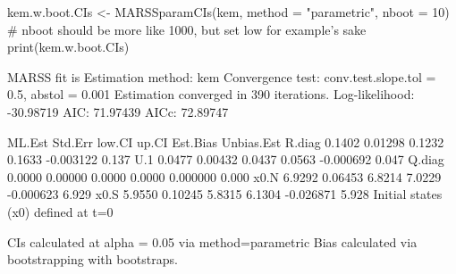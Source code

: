 \begin{Schunk}
\begin{Sinput}
 kem.w.boot.CIs <- MARSSparamCIs(kem, method = "parametric", nboot = 10)
 # nboot should be more like 1000, but set low for example's sake
 print(kem.w.boot.CIs)
\end{Sinput}
\begin{Soutput}
MARSS fit is
Estimation method: kem 
Convergence test: conv.test.slope.tol = 0.5, abstol = 0.001
Estimation converged in 390 iterations. 
Log-likelihood: -30.98719 
AIC: 71.97439   AICc: 72.89747   
 
       ML.Est Std.Err low.CI  up.CI  Est.Bias Unbias.Est
R.diag 0.1402 0.01298 0.1232 0.1633 -0.003122      0.137
U.1    0.0477 0.00432 0.0437 0.0563 -0.000692      0.047
Q.diag 0.0000 0.00000 0.0000 0.0000  0.000000      0.000
x0.N   6.9292 0.06453 6.8214 7.0229 -0.000623      6.929
x0.S   5.9550 0.10245 5.8315 6.1304 -0.026871      5.928
Initial states (x0) defined at t=0

CIs calculated at alpha = 0.05 via method=parametric 
Bias calculated via  bootstrapping with  bootstraps. 
\end{Soutput}
\end{Schunk}
